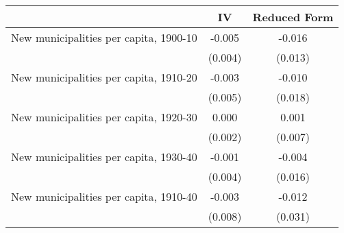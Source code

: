  \begin{tabular}{l*{2}{c}} \toprule
                &\multicolumn{1}{c}{IV}&\multicolumn{1}{c}{Reduced Form}\\
\midrule
New municipalities per capita, 1900-10&   -0.005   &   -0.016   \\
                &  (0.004)   &  (0.013)   \\
\addlinespace
New municipalities per capita, 1910-20&   -0.003   &   -0.010   \\
                &  (0.005)   &  (0.018)   \\
\addlinespace
New municipalities per capita, 1920-30&    0.000   &    0.001   \\
                &  (0.002)   &  (0.007)   \\
\addlinespace
New municipalities per capita, 1930-40&   -0.001   &   -0.004   \\
                &  (0.004)   &  (0.016)   \\
\addlinespace
New municipalities per capita, 1910-40&   -0.003   &   -0.012   \\
                &  (0.008)   &  (0.031)   \\
       \bottomrule \end{tabular}
